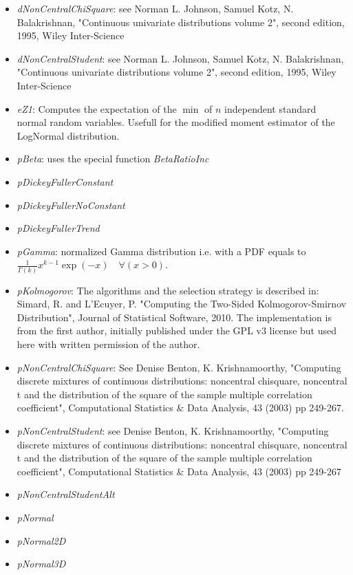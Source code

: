 \begin{itemize}
\item \textit{dNonCentralChiSquare}: see Norman L. Johnson, Samuel Kotz, N. Balakrishnan, "Continuous univariate distributions volume 2", second edition, 1995, Wiley Inter-Science
\item \textit{dNonCentralStudent}: see Norman L. Johnson, Samuel Kotz, N. Balakrishnan, "Continuous univariate distributions volume 2", second edition, 1995, Wiley Inter-Science
\item \textit{eZ1}: Computes the expectation of the $\min$ of $n$ independent standard normal random variables. Usefull for the modified moment estimator of the LogNormal distribution.
\item \textit{pBeta}: uses the special function \textit{BetaRatioInc}
\item \textit{pDickeyFullerConstant}
\item \textit{pDickeyFullerNoConstant}
\item \textit{pDickeyFullerTrend}
\item \textit{pGamma}: normalized Gamma distribution i.e. with a PDF equals
to $\frac{1}{ \Gamma(k)} x ^ {k - 1} \exp(-x)\quad  \forall (x > 0)$.
\item \textit{pKolmogorov}: The algorithms and the selection strategy is described in:
Simard, R. and L'Ecuyer, P. "Computing the Two-Sided Kolmogorov-Smirnov Distribution", Journal of Statistical Software, 2010.
The implementation is from the first author, initially published under the GPL v3 license but used here with written permission of the author.
\item \textit{pNonCentralChiSquare}: See  Denise Benton, K. Krishnamoorthy,
"Computing discrete mixtures of continuous distributions:
noncentral  chisquare, noncentral t and the distribution of the
square of the sample multiple correlation coefficient", Computational Statistics \& Data Analysis, 43 (2003) pp
249-267.
\item \textit{pNonCentralStudent}:  see Denise Benton, K. Krishnamoorthy, "Computing discrete mixtures of continuous distributions: noncentral chisquare, noncentral t
and the distribution of the square of the sample multiple correlation coefficient",
Computational Statistics \& Data Analysis, 43 (2003) pp 249-267
\item \textit{pNonCentralStudentAlt}
\item \textit{pNormal}
\item \textit{pNormal2D}
\item \textit{pNormal3D}

\end{itemize}
